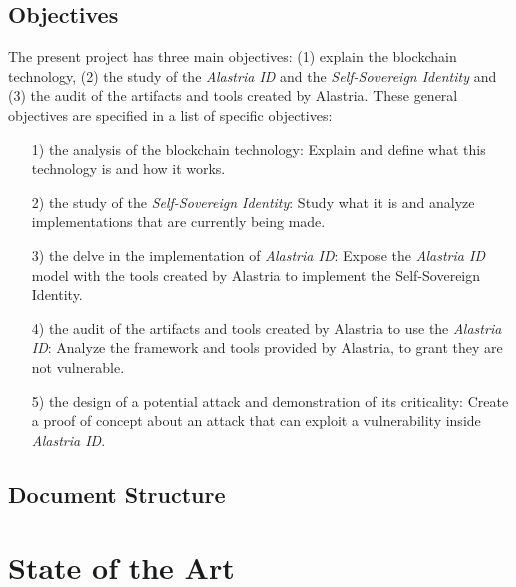 \documentclass[a4paper, 12pt]{article} %
\begin{document}
        \subsection{Objectives}
            The present project has three main objectives: (1) explain the blockchain technology, (2) the study of the \textit{Alastria ID} and the \textit{Self-Sovereign Identity} and (3) the audit of the artifacts and tools created by Alastria. These general objectives are specified in a list of specific objectives:
            \begin{itemize} 
                \item[1)] the analysis of the blockchain technology: Explain and define what this technology is and how it works.
                \item[2)] the study of the \textit{Self-Sovereign Identity}: Study what it is and analyze implementations that are currently being made.
                \item[3)] the delve in the implementation of \textit{Alastria ID}: Expose the \textit{Alastria ID} model with the tools created by Alastria to implement the Self-Sovereign Identity.
                \item[4)] the audit of the artifacts and tools created by Alastria to use the \textit{Alastria ID}: Analyze the framework and tools provided by Alastria, to grant they are not vulnerable.
                \item[5)] the design of a potential attack and demonstration of its criticality: Create a proof of concept about an attack that can exploit a vulnerability inside \textit{Alastria ID}.
            \end{itemize}
            
        \subsection{Document Structure}
        \newpage
        
\section{State of the Art}
\end{document}
